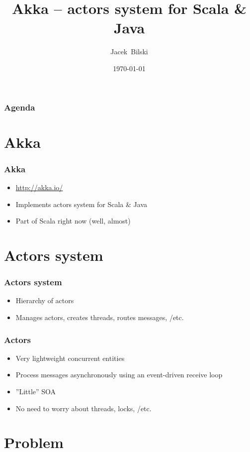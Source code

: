 \documentclass[xcolor=dvipsnames]{beamer}
\title{Akka -- actors system for Scala \& Java}
\author{Jacek~Bilski}
\date{\today}
\begin{document}
\begin{frame}
\titlepage
\end{frame}

\begin{frame}
\frametitle{Agenda}
\tableofcontents[pausesections]
\end{frame}

\section{Akka}

\begin{frame}
\frametitle{Akka}
\begin{itemize}
\item \href{http://akka.io/}{http://akka.io/}
\item Implements actors system for Scala \& Java
\item Part of Scala right now (well, almost)
\end{itemize}
\end{frame}


\section{Actors system}

\begin{frame}
\frametitle{Actors system}
\begin{itemize}
\item Hierarchy of actors
\item Manages actors, creates threads, routes messages, /etc.
\end{itemize}
\end{frame}

\begin{frame}
\frametitle{Actors}
\begin{itemize}
\item Very lightweight concurrent entities
\item Process messages asynchronously using an event-driven receive loop
\item ''Little'' SOA
\item No need to worry about threads, locks, /etc.
\end{itemize}
\end{frame}

\section{Problem}
\end{document}
